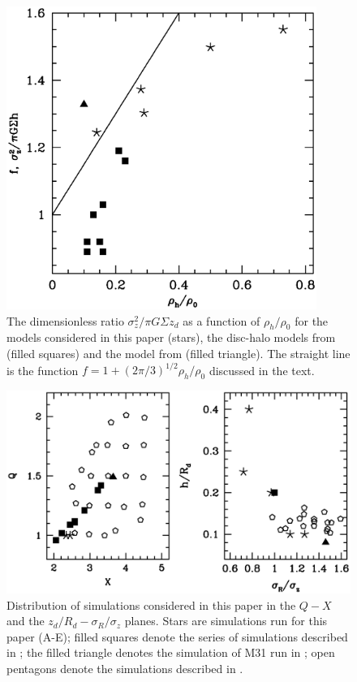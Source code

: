 \begin{figure}
	\centering
        \includegraphics[width=0.9\textwidth]{../figures/falpha.eps}
        \caption{The dimensionless ratio $\sigma_z^2/\pi G\Sigma z_d$ as a
          function of $\rho_h/\rho_0$ for the models considered in
          this paper (stars), the disc-halo models from
          \citet{YurinSpringelStellarDisks} (filled squares) and the
          model from \citet{gauthier2006} (filled triangle).  The
          straight line is the function $f = 1 + \left (2\pi/3\right
          )^{1/2}\rho_h/\rho_0$ discussed in the text.}
\label{fig:falpha}\end{figure}

\begin{figure}
	\centering
        \includegraphics[width=1.\textwidth]{../figures/qxr.eps}
        \caption{Distribution of simulations considered in this paper
          in the $Q-X$ and the $z_d/R_d-\sigma_R/\sigma_z$ planes.
          Stars are simulations run for this paper (A-E); filled
          squares denote the series of simulations described in
          \citet{YurinSpringelStellarDisks}; the filled triangle denotes
          the simulation of M31 run in \citet{gauthier2006}; open
          pentagons denote the simulations described in
          \citet{WPDGalactICSReference}.
        }\label{fig:QXR}\end{figure}


